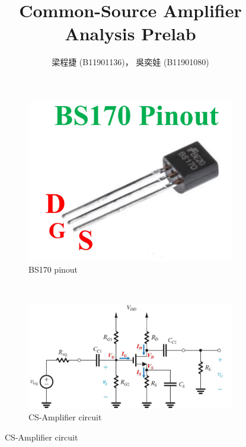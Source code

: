\documentclass{article}
\title{Common-Source Amplifier Analysis Prelab}
\author{梁程捷 (B11901136)， 吳奕娃 (B11901080)}
\date{}
\begin{document}
\begin{CJK*}{UTF8}{bkai}

\maketitle


\begin{figure}[h]
    \begin{center}
    
        \begin{subfigure}[b]{0.25\textwidth}
            \includegraphics[width=\textwidth]{BS170_pinout.jpg}
            \caption{BS170 pinout}
        \end{subfigure}
        ~
        \begin{subfigure}[b]{0.7\textwidth}
            \includegraphics[width=\textwidth]{cs_amp_circuit.jpg}
            \caption{CS-Amplifier circuit}
        \end{subfigure}
    \end{center}
\end{figure}


\end{CJK*}
\end{document}
